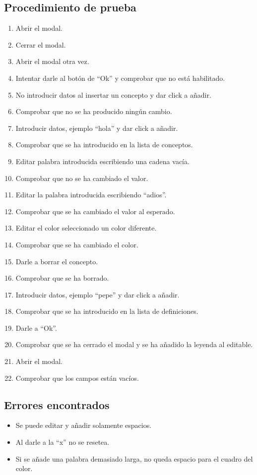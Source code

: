 \subsection{Procedimiento de prueba}
\label{procedimientoPruebas:leyenda}
\begin{enumerate}
    \item Abrir el modal.
    \item Cerrar el modal.
    \item Abrir el modal otra vez.
    \item Intentar darle al botón de ``Ok'' y comprobar que no está habilitado.
    \item No introducir datos al insertar un concepto y dar click a añadir.
    \item Comprobar que no se ha producido ningún cambio.
    \item Introducir datos, ejemplo ``hola'' y dar click a añadir.
    \item Comprobar que se ha introducido en la lista de conceptos.
    \item Editar palabra introducida escribiendo una cadena vacía.
    \item Comprobar que no se ha cambiado el valor.
    \item Editar la palabra introducida escribiendo ``adios''.
    \item Comprobar que se ha cambiado el valor al esperado.
    \item Editar el color seleccionado un color diferente.
    \item Comprobar que se ha cambiado el color.
    \item Darle a borrar el concepto.
    \item Comprobar que se ha borrado.
    \item Introducir datos, ejemplo ``pepe'' y dar click a añadir.
    \item Comprobar que se ha introducido en la lista de definiciones.
    \item Darle a ``Ok''.
    \item Comprobar que se ha cerrado el modal y se ha añadido la leyenda al editable.
    \item Abrir el modal.
    \item Comprobar que los campos están vacíos.
\end{enumerate}

\subsection{Errores encontrados}
\label{errores:leyenda}
\begin{itemize}
    \item  Se puede editar y añadir solamente espacios.
    \item  Al darle a la ``x'' no se resetea.
    \item Si se añade una palabra demasiado larga, no queda espacio para el cuadro del color.
\end{itemize}

